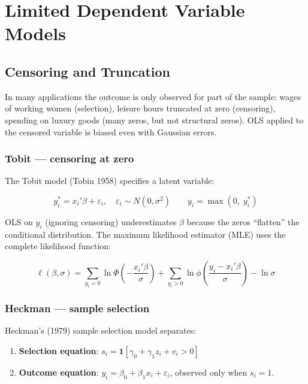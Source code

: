 \chapter{Limited Dependent Variable Models}
\label{cap:limitada}

\section{Censoring and Truncation}

In many applications the outcome is only observed for part of the sample:
wages of working women (selection), leisure hours truncated at zero (censoring),
spending on luxury goods (many zeros, but not structural zeros). OLS applied
to the censored variable is biased even with Gaussian errors.

\subsection*{Tobit — censoring at zero}

The Tobit model (Tobin 1958) specifies a latent variable:

\[
  y_i^* = x_i'\beta + \varepsilon_i, \quad \varepsilon_i \sim N(0,\sigma^2)
  \qquad
  y_i = \max(0,\; y_i^*)
\]

OLS on $y_i$ (ignoring censoring) underestimates $\beta$ because the zeros
``flatten'' the conditional distribution. The maximum likelihood estimator
(MLE) uses the complete likelihood function:

\[
  \ell(\beta,\sigma) = \sum_{y_i=0} \ln\Phi\!\left(-\frac{x_i'\beta}{\sigma}\right)
  + \sum_{y_i>0} \ln\phi\!\left(\frac{y_i - x_i'\beta}{\sigma}\right) - \ln\sigma
\]

\subsection*{Heckman — sample selection}

Heckman's (1979) sample selection model separates:
\begin{enumerate}
  \item \textbf{Selection equation}: $s_i = \mathbf{1}[\gamma_0 + \gamma_1 z_i + v_i > 0]$
  \item \textbf{Outcome equation}: $y_i = \beta_0 + \beta_1 x_i + \varepsilon_i$,
  observed only when $s_i = 1$.
\end{enumerate}

